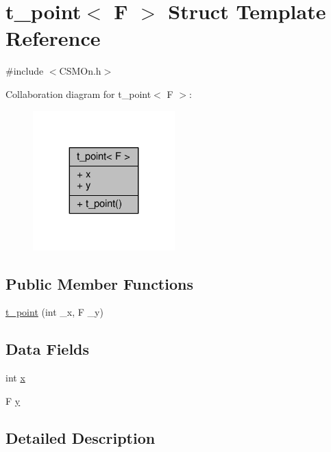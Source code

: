 \hypertarget{structt__point}{}\section{t\+\_\+point$<$ F $>$ Struct Template Reference}
\label{structt__point}


{\ttfamily \#include $<$C\+S\+M\+On.\+h$>$}



Collaboration diagram for t\+\_\+point$<$ F $>$\+:
\nopagebreak
\begin{figure}[H]
\begin{center}
\leavevmode
\includegraphics[width=155pt]{structt__point__coll__graph}
\end{center}
\end{figure}
\subsection*{Public Member Functions}
\begin{DoxyCompactItemize}
\item 
\hyperlink{structt__point_af5c0909d426a10340846bc6f2bb765e6}{t\+\_\+point} (int \+\_\+x, F \+\_\+y)
\end{DoxyCompactItemize}
\subsection*{Data Fields}
\begin{DoxyCompactItemize}
\item 
int \hyperlink{structt__point_aacf212cab9b48c1116cd7c1ab8861b24}{x}
\item 
F \hyperlink{structt__point_a17c8b258b76ba9d626ff9ddcdd7900e0}{y}
\end{DoxyCompactItemize}


\subsection{Detailed Description}
